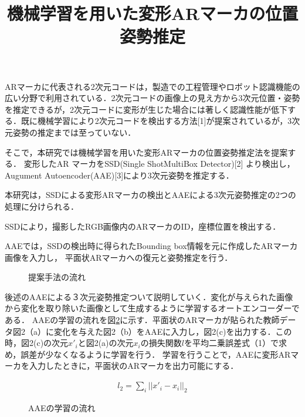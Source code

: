 \documentclass{jsarticle}
\title{機械学習を用いた変形ARマーカの位置姿勢推定}
\begin{document}
\maketitle

ARマーカに代表される2次元コードは，製造での工程管理やロボット認識機能の広い分野で利用されている．2次元コードの画像上の見え方から3次元位置・姿勢を推定できるが，2次元コードに変形が生じた場合には著しく認識性能が低下する．既に機械学習により2次元コードを検出する方法[1]が提案されているが，3次元姿勢の推定までは至っていない．

そこで，本研究では機械学習を用いた変形ARマーカの位置姿勢推定法を提案する．
変形したAR マーカをSSD(Single ShotMultiBox Detector)[2]
より検出し，Augument Autoencoder(AAE)[3]により3次元姿勢を推定する．


本研究は，SSDによる変形ARマーカの検出とAAEによる3次元姿勢推定の2つの処理に分けられる．

SSDにより，撮影したRGB画像内のARマーカのID，座標位置を検出する．

AAEでは，SSDの検出時に得られたBounding box情報を元に作成したARマーカ画像を入力し，
平面状ARマーカへの復元と姿勢推定を行う．

\begin{figure}[ht]
\vspace{0zh}
\setlength{\epsfxsize}{6.5cm}
\centerline{}
\vspace{-1zh}
\caption{提案手法の流れ}
\label{flow}
\vspace{-2zh}
\end{figure}

後述のAAEによる３次元姿勢推定ついて説明していく．変化が与えられた画像から変化を取り除いた画像として生成するように学習するオートエンコーダーである．
AAEの学習の流れを図\ref{BB}に示す．平面状のARマーカが貼られた教師データ図2（a）に変化を与えた図2（b）をAAEに入力し，図2(c)を出力する．この時，図2(c)の次元$x'_i$と図2(a)の次元$x_i$の損失関数$l$を平均二乗誤差式（1）で求め，誤差が少なくなるように学習を行う．
学習を行うことで，AAEに変形ARマーカを入力したときに，平面状のARマーカを出力可能にする．

\begin{eqnarray}
\label{sonsitu}
l_2=\sum_{i} ||x'_i-x_i||_2
\end{eqnarray}

\begin{figure}[ht]
\vspace{0zh}
\setlength{\epsfxsize}{7.5cm}
\centerline{}
\vspace{0zh}
\caption{AAEの学習の流れ}
\label{BB}
\vspace{1zh}
\end{figure}
\end{document}
